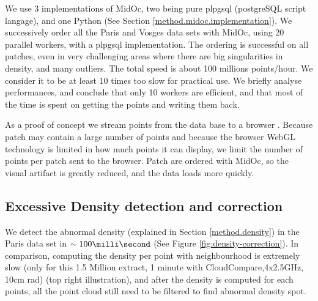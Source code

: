 		
		We use 3 implementations of MidOc, two being pure plpgsql (postgreSQL script langage), and one Python (See Section \ref{method.midoc.implementation}).
		We successively order all the Paris and Vosges data sets with MidOc, using 20 parallel workers, with a plpgsql implementation.
		The ordering is successful on all patches, even in very challenging areas where there are big singularities in density, and many outliers.
		The total speed is about 100 millions points/hour.
		We consider it to be at least 10 times too slow for practical use.
		We briefly analyse performances, and conclude that only 10 workers are efficient, and that most of the time is spent on getting the points and writing them back.
		
		 
		As a proof of concept we stream points from the data base to a browser \cite{IGN2014a}. Because patch may contain a large number of points and because the browser WebGL technology is limited in how much points it can display,
		we limit the number of points per patch sent to the browser. Patch are ordered with MidOc, so the visual artifact is greatly reduced, and the data loads more quickly. 


	\subsection{Excessive Density detection and correction}
	
		
		We detect the abnormal density (explained in Section \ref{method.density}) in the Paris data set in $\sim 100 \milli \second$ 
		(See Figure \ref{fig:density-correction}). 
		In comparison, computing the density per point with neighbourhood is extremely slow (only for this 1.5 Million extract, 1 minute with CloudCompare,4x2.5GHz, 10cm rad) (top right illustration), and after the density is computed for each points, all the point cloud still need to be filtered to find abnormal density spot.
		
